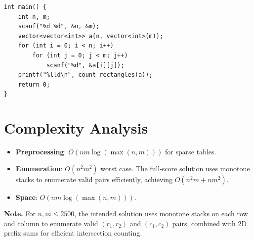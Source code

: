 \documentclass[11pt,a4paper]{article}
\begin{document}
\begin{lstlisting}
int main() {
    int n, m;
    scanf("%d %d", &n, &m);
    vector<vector<int>> a(n, vector<int>(m));
    for (int i = 0; i < n; i++)
        for (int j = 0; j < m; j++)
            scanf("%d", &a[i][j]);
    printf("%lld\n", count_rectangles(a));
    return 0;
}
\end{lstlisting}

\section{Complexity Analysis}
\begin{itemize}
  \item \textbf{Preprocessing}: $O(nm \log(\max(n,m)))$ for sparse tables.
  \item \textbf{Enumeration}: $O(n^2 m^2)$ worst case. The full-score solution uses monotone stacks to enumerate valid pairs efficiently, achieving $O(n^2 m + nm^2)$.
  \item \textbf{Space}: $O(nm \log(\max(n,m)))$.
\end{itemize}

\textbf{Note.} For $n, m \le 2500$, the intended solution uses monotone stacks on each row and column to enumerate valid $(r_1, r_2)$ and $(c_1, c_2)$ pairs, combined with 2D prefix sums for efficient intersection counting.
\end{document}
